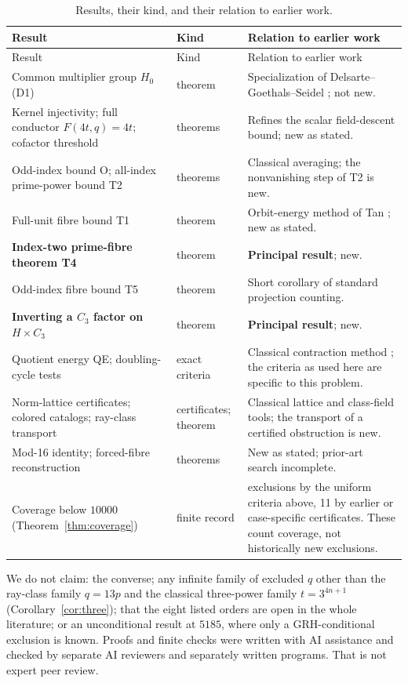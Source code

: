 \documentclass[11pt]{article}
\theoremstyle{definition}
\theoremstyle{remark}
\begin{document}
\begingroup\small
\setlength{\tabcolsep}{4pt}
\begin{longtable}{>{\raggedright\arraybackslash}p{}>{\raggedright\arraybackslash}p{}>{\raggedright\arraybackslash}p{}}
\caption{Results, their kind, and their relation to earlier work.}
\label{tab:contents}\\
\hline
Result & Kind & Relation to earlier work\\
\hline\endfirsthead
\hline Result & Kind & Relation to earlier work\\ \hline\endhead
Common multiplier group $H_0$ (D1) & theorem & Specialization of
 Delsarte--Goethals--Seidel \cite{DGS71}; not new.\\
Kernel injectivity; full conductor $F(4t,q)=4t$; cofactor threshold &
 theorems & Refines the scalar field-descent bound; new as stated.\\
Odd-index bound O; all-index prime-power bound T2 & theorems & Classical
 averaging; the nonvanishing step of T2 is new.\\
Full-unit fibre bound T1 & theorem & Orbit-energy method of Tan
 \cite{Tan18}; new as stated.\\
\textbf{Index-two prime-fibre theorem T4} & theorem & \textbf{Principal
 result}; new.\\
Odd-index fibre bound T5 & theorem & Short corollary of standard projection
 counting.\\
\textbf{Inverting a $C_3$ factor on $H\times C_3$} & theorem &
 \textbf{Principal result}; new.\\
Quotient energy QE; doubling-cycle tests & exact criteria & Classical
 contraction method \cite{JP99,AGZ21,Gordon26}; the criteria as used here
 are specific to this problem.\\
Norm-lattice certificates; colored catalogs; ray-class transport & certificates;
 theorem & Classical lattice and class-field tools; the transport of a
 certified obstruction is new.\\
Mod-16 identity; forced-fibre reconstruction & theorems & New as stated;
 prior-art search incomplete.\\
Coverage below $10000$ (Theorem~\ref{thm:coverage}) & finite record & 644
 exclusions by the uniform criteria above, 11 by earlier or case-specific
 certificates. These count coverage, not historically new exclusions.\\
\hline
\end{longtable}
\endgroup

We do not claim: the converse; any infinite family of excluded $q$ other
than the ray-class family $q=13p$ and the classical three-power family
$t=3^{4n+1}$ (Corollary~\ref{cor:three}); that the eight listed orders are open in
the whole literature; or an unconditional result at $5185$, where only a
GRH-conditional exclusion is known. Proofs and finite checks were written
with AI assistance and checked by separate AI reviewers and separately
written programs. That is not expert peer review.
\end{document}
